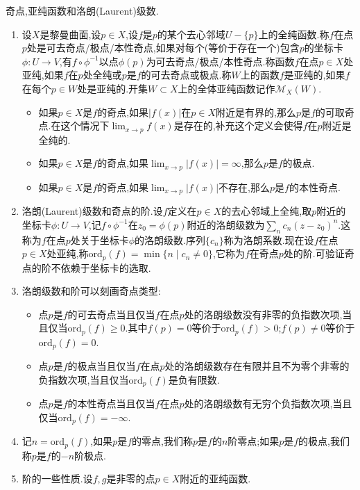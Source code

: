 奇点,亚纯函数和洛朗(Laurent)级数.
\begin{enumerate}
	\item 设$X$是黎曼曲面,设$p\in X$,设$f$是$p$的某个去心邻域$U-\{p\}$上的全纯函数.称$f$在点$p$处是可去奇点/极点/本性奇点,如果对每个(等价于存在一个)包含$p$的坐标卡$\phi:U\to V$,有$f\circ\phi^{-1}$以点$\phi(p)$为可去奇点/极点/本性奇点.称函数$f$在点$p\in X$处亚纯,如果$f$在$p$处全纯或$p$是$f$的可去奇点或极点.称$W$上的函数$f$是亚纯的,如果$f$在每个$p\in W$处是亚纯的.开集$W\subset X$上的全体亚纯函数记作$\mathscr{M}_X(W)$.
	\begin{itemize}
		\item 如果$p\in X$是$f$的奇点,如果$|f(x)|$在$p\in X$附近是有界的,那么$p$是$f$的可取奇点.在这个情况下$\lim_{x\to p}f(x)$是存在的,补充这个定义会使得$f$在$p$附近是全纯的.
		\item 如果$p\in X$是$f$的奇点,如果$\lim_{x\to p}|f(x)|=\infty$,那么$p$是$f$的极点.
		\item 如果$p\in X$是$f$的奇点,如果$\lim_{x\to p}|f(x)|$不存在,那么$p$是$f$的本性奇点.
	\end{itemize}
    \item 洛朗(Laurent)级数和奇点的阶.设$f$定义在$p\in X$的去心邻域上全纯,取$p$附近的坐标卡$\phi:U\to V$,记$f\circ\phi^{-1}$在$z_0=\phi(p)$附近的洛朗级数为$\sum_nc_n(z-z_0)^n$.这称为$f$在点$p$处关于坐标卡$\phi$的洛朗级数.序列$\{c_n\}$称为洛朗系数.现在设$f$在点$p\in X$处亚纯,称$\mathrm{ord}_p(f)=\min\{n\mid c_n\not=0\}$,它称为$f$在奇点$p$处的阶.可验证奇点的阶不依赖于坐标卡的选取.
	\item 洛朗级数和阶可以刻画奇点类型:
	\begin{itemize}
		\item 点$p$是$f$的可去奇点当且仅当$f$在点$p$处的洛朗级数没有非零的负指数次项,当且仅当$\mathrm{ord}_p(f)\ge0$.其中$f(p)=0$等价于$\mathrm{ord}_p(f)>0$;$f(p)\not=0$等价于$\mathrm{ord}_p(f)=0$.
		\item 点$p$是$f$的极点当且仅当$f$在点$p$处的洛朗级数存在有限并且不为零个非零的负指数次项,当且仅当$\mathrm{ord}_p(f)$是负有限数.
		\item 点$p$是$f$的本性奇点当且仅当$f$在点$p$处的洛朗级数有无穷个负指数次项,当且仅当$\mathrm{ord}_p(f)=-\infty$.
	\end{itemize}
	\item 记$n=\mathrm{ord}_p(f)$,如果$p$是$f$的零点,我们称$p$是$f$的$n$阶零点;如果$p$是$f$的极点,我们称$p$是$f$的$-n$阶极点.
	\item 阶的一些性质.设$f,g$是非零的点$p\in X$附近的亚纯函数.
	\begin{itemize}

\end{itemize}
\end{enumerate}
